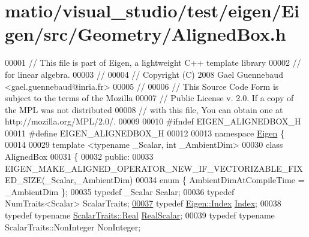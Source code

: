 \hypertarget{matio_2visual__studio_2test_2eigen_2_eigen_2src_2_geometry_2_aligned_box_8h_source}{}\section{matio/visual\+\_\+studio/test/eigen/\+Eigen/src/\+Geometry/\+Aligned\+Box.h}
\label{matio_2visual__studio_2test_2eigen_2_eigen_2src_2_geometry_2_aligned_box_8h_source}

\begin{DoxyCode}
00001 \textcolor{comment}{// This file is part of Eigen, a lightweight C++ template library}
00002 \textcolor{comment}{// for linear algebra.}
00003 \textcolor{comment}{//}
00004 \textcolor{comment}{// Copyright (C) 2008 Gael Guennebaud <gael.guennebaud@inria.fr>}
00005 \textcolor{comment}{//}
00006 \textcolor{comment}{// This Source Code Form is subject to the terms of the Mozilla}
00007 \textcolor{comment}{// Public License v. 2.0. If a copy of the MPL was not distributed}
00008 \textcolor{comment}{// with this file, You can obtain one at http://mozilla.org/MPL/2.0/.}
00009 
00010 \textcolor{preprocessor}{#ifndef EIGEN\_ALIGNEDBOX\_H}
00011 \textcolor{preprocessor}{#define EIGEN\_ALIGNEDBOX\_H}
00012 
00013 \textcolor{keyword}{namespace }\hyperlink{namespace_eigen}{Eigen} \{ 
00014 
00029 \textcolor{keyword}{template} <\textcolor{keyword}{typename} \_Scalar, \textcolor{keywordtype}{int} \_AmbientDim>
00030 \textcolor{keyword}{class }AlignedBox
00031 \{
00032 \textcolor{keyword}{public}:
00033 EIGEN\_MAKE\_ALIGNED\_OPERATOR\_NEW\_IF\_VECTORIZABLE\_FIXED\_SIZE(\_Scalar,\_AmbientDim)
00034   \textcolor{keyword}{enum} \{ AmbientDimAtCompileTime = \_AmbientDim \};
00035   \textcolor{keyword}{typedef} \_Scalar                                   Scalar;
00036   \textcolor{keyword}{typedef} NumTraits<Scalar>                         ScalarTraits;
\hyperlink{group___geometry___module_a774ef355da13d6bee6a6e7244c15231a}{00037}   \textcolor{keyword}{typedef} \hyperlink{namespace_eigen_a62e77e0933482dafde8fe197d9a2cfde}{Eigen::Index}                              \hyperlink{group___geometry___module_a774ef355da13d6bee6a6e7244c15231a}{Index}; 
00038   \textcolor{keyword}{typedef} \textcolor{keyword}{typename} \hyperlink{group___sparse_core___module}{ScalarTraits::Real}               \hyperlink{group___sparse_core___module}{RealScalar};
00039   \textcolor{keyword}{typedef} \textcolor{keyword}{typename} ScalarTraits::NonInteger         NonInteger;

\end{DoxyCode}

